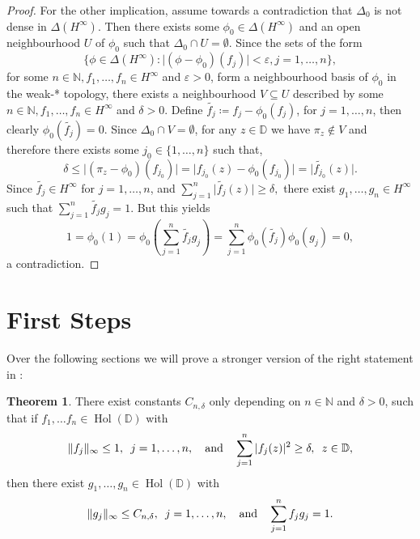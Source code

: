 \documentclass[letterpaper, 11pt]{article}
\newcommand{\D}{\mathbb{D}}
\newcommand{\N}{\mathbb{N}}
\newcommand{\1}{\mathds{1}}
\DeclareMathOperator*{\Hol}{Hol}
\theoremstyle{definition}
\newtheorem{theorem}{Theorem}
\begin{document}
\begin{proof}
  For the other implication, assume towards a contradiction that $\Delta_0$ is not dense in $\Delta(H^\infty)$. Then there exists some $\phi_0 \in \Delta(H^\infty)$ and an open neighbourhood $U$ of $\phi_0$ such that $\Delta_0 \cap U = \emptyset$. Since the sets of the form
  $$ \{ \phi \in \Delta(H^\infty) : \vert (\phi - \phi_0)(f_j) \vert < \varepsilon, j = 1, \dots, n \}, $$
  for some $n \in \N, f_1, \dots, f_n \in H^\infty$ and $\varepsilon > 0$, form a neighbourhood basis of $\phi_0$ in the weak\nobreakdash-* topology, there exists a neighbourhood $V \subseteq U$ described by some $n \in \N, f_1, \dots, f_n \in H^\infty$ and $\delta > 0$. Define $\widetilde{f_j} \coloneqq f_j - \phi_0(f_j)$, for $j=1,\dots,n$, then clearly $\phi_0(\widetilde{f_j}) = 0$. Since $\Delta_0 \cap V = \emptyset$, for any $z \in \D$ we have $\pi_z \notin V$ and therefore there exists some $j_0 \in \{ 1, \dots, n \}$ such that,
  $$ \delta \leq \vert (\pi_z - \phi_0)(f_{j_0}) \vert = \vert f_{j_0}(z) - \phi_0(f_{j_0}) \vert = \vert \widetilde{f_{j_0}}(z) \vert. $$
  Since $\widetilde{f_j} \in H^\infty$ for $j=1,\dots,n$, and $ \sum_{j=1}^n \vert \widetilde{f_j}(z) \vert \geq \delta, $ there exist $g_1, \dots, g_n \in H^\infty$ such that $\sum_{j=1}^n \widetilde{f_j} g_j = 1$. But this yields
  $$ 1 = \phi_0(1) = \phi_0 \left( \sum_{j=1}^n \widetilde{f_j} g_j \right) = \sum_{j=1}^n \phi_0(\widetilde{f_j}) \phi_0(g_j) = 0, $$
  a contradiction.
\end{proof}

\section{First Steps}

Over the following sections we will prove a stronger version of the right statement in :

\begin{theorem}
  There exist constants $C_{n,\delta}$ only depending on $n \in \N$ and $\delta > 0$, such that if $f_1, \dots f_n \in \Hol(\D)$ with
  $$ \Vert f_j \Vert_\infty \leq 1, \hspace{0.5em} j = 1, \dots, n, \quad \textrm{and} \quad \sum_{j=1}^n \vert f_j(z) \vert^2 \geq \delta, \hspace{0.5em} z \in \D, $$
  then there exist $g_1, \dots, g_n \in \Hol(\D)$ with
  $$ \Vert g_j \Vert_\infty \leq C_{n,\delta}, \hspace{0.5em} j = 1, \dots, n, \quad \textrm{and} \quad \sum_{j=1}^n f_j g_j = 1. $$
\end{theorem}
\end{document}
